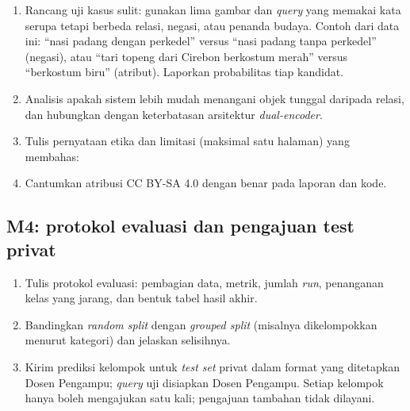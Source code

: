 \documentclass[12pt, a4paper]{article}
\begin{document}
\begin{enumerate}
  \item Rancang uji kasus sulit: gunakan lima gambar dan \emph{query} yang memakai kata serupa tetapi berbeda relasi, negasi, atau penanda budaya. Contoh dari data ini: ``nasi padang dengan perkedel'' versus ``nasi padang tanpa perkedel'' (negasi), atau ``tari topeng dari Cirebon berkostum merah'' versus ``berkostum biru'' (atribut). Laporkan probabilitas tiap kandidat.
  \item Analisis apakah sistem lebih mudah menangani objek tunggal daripada relasi, dan hubungkan dengan keterbatasan arsitektur \emph{dual-encoder}.
  \item Tulis pernyataan etika dan limitasi (maksimal satu halaman) yang membahas:
  \item Cantumkan atribusi CC BY-SA 4.0 dengan benar pada laporan dan kode.
\end{enumerate}

\subsection{M4: protokol evaluasi dan pengajuan test privat}

\begin{enumerate}
  \item Tulis protokol evaluasi: pembagian data, metrik, jumlah \emph{run}, penanganan kelas yang jarang, dan bentuk tabel hasil akhir.
  \item Bandingkan \emph{random split} dengan \emph{grouped split} (misalnya dikelompokkan menurut kategori) dan jelaskan selisihnya.
  \item Kirim prediksi kelompok untuk \emph{test set} privat dalam format yang ditetapkan Dosen Pengampu; \emph{query} uji disiapkan Dosen Pengampu. Setiap kelompok hanya boleh mengajukan satu kali; pengajuan tambahan tidak dilayani.
\end{enumerate}
\end{document}
